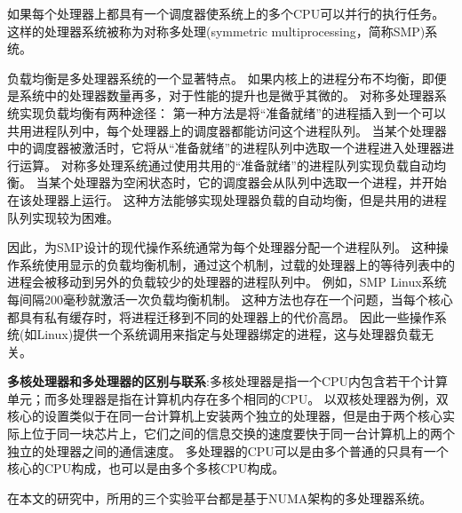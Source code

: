如果每个处理器上都具有一个调度器使系统上的多个CPU可以并行的执行任务。
这样的处理器系统被称为对称多处理(symmetric multiprocessing，简称SMP)系统。

负载均衡是多处理器系统的一个显著特点。
如果内核上的进程分布不均衡，即便是系统中的处理器数量再多，对于性能的提升也是微乎其微的。
对称多处理器系统实现负载均衡有两种途径：
第一种方法是将“准备就绪”的进程插入到一个可以共用进程队列中，每个处理器上的调度器都能访问这个进程队列。
当某个处理器中的调度器被激活时，它将从“准备就绪”的进程队列中选取一个进程进入处理器进行运算。
对称多处理系统通过使用共用的“准备就绪”的进程队列实现负载自动均衡。
当某个处理器为空闲状态时，它的调度器会从队列中选取一个进程，并开始在该处理器上运行。
这种方法能够实现处理器负载的自动均衡，但是共用的进程队列实现较为困难。

因此，为SMP设计的现代操作系统通常为每个处理器分配一个进程队列。
这种操作系统使用显示的负载均衡机制，通过这个机制，过载的处理器上的等待列表中的进程会被移动到另外的负载较少的处理器的进程队列中。
例如，SMP Linux系统每间隔200毫秒就激活一次负载均衡机制\cite{bolla2008effective}。
这种方法也存在一个问题，当每个核心都具有私有缓存时，将进程迁移到不同的处理器上的代价高昂。
因此一些操作系统(如Linux)提供一个系统调用来指定与处理器绑定的进程，这与处理器负载无关。

\textbf{多核处理器和多处理器的区别与联系}:多核处理器是指一个CPU内包含若干个计算单元；而多处理器是指在计算机内存在多个相同的CPU。
以双核处理器为例，双核心的设置类似于在同一台计算机上安装两个独立的处理器，但是由于两个核心实际上位于同一块芯片上，它们之间的信息交换的速度要快于同一台计算机上的两个独立的处理器之间的通信速度。
多处理器的CPU可以是由多个普通的只具有一个核心的CPU构成，也可以是由多个多核CPU构成。

在本文的研究中，所用的三个实验平台都是基于NUMA架构的多处理器系统。




